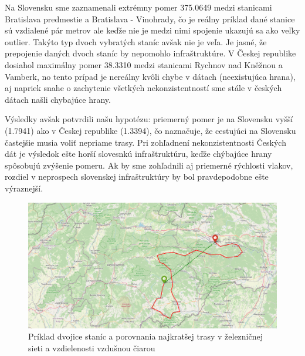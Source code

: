 \documentclass[main.tex]{subfiles}
\begin{document}
Na Slovensku sme zaznamenali extrémny pomer 375.0649 medzi stanicami Bratislava predmestie a Bratislava - Vinohrady, čo je reálny príklad dané stanice sú vzdialené pár metrov ale keďže nie je medzi nimi spojenie ukazujú sa ako veľky outlier. Takýto typ dvoch vybratých staníc avšak nie je veľa. Je jasné, že prepojenie daných dvoch staníc by nepomohlo infraštruktúre. V Českej republike dosiahol maximálny pomer 38.3310 medzi stanicami Rychnov nad Kněžnou a Vamberk, no tento prípad je nereálny kvôli chybe v dátach (neexistujúca hrana), aj napriek snahe o zachytenie všetkých nekonzistentností sme stále v českých dátach našli chybajúce hrany. 


Výsledky avšak potvrdili našu hypotézu: priemerný pomer je na Slovensku vyšší (1.7941) ako v Českej republike (1.3394), čo naznačuje, že cestujúci na Slovensku častejšie musia voliť nepriame trasy. Pri zohľadnení nekonzistentnosti Českých dát je výsledok ešte horší slovesnkú infraštruktúru, keďže chýbajúce hrany spôsobujú zvýšenie pomeru. Ak by sme zohľadnili aj priemerné rýchlosti vlakov, rozdiel v neprospech slovenskej infraštruktúry by bol pravdepodobne ešte výraznejší.

\begin{figure}
\centerline{\includegraphics[width=1.2\textwidth]{images/sk_shortest_path_vs_skyline.png}}
\caption{Príklad dvojice staníc a porovnania najkratšej trasy v železničnej sieti a vzdielenosti vzdušnou čiarou}
\label{obr:svk_skyline_vs_shortest}
\end{figure}
\end{document}
